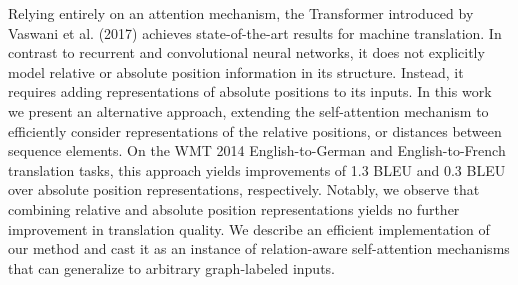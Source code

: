 Relying entirely on an attention mechanism, the Transformer introduced by Vaswani et al. (2017) achieves state-of-the-art results for machine translation. In contrast to recurrent and convolutional neural networks, it does not explicitly model relative or absolute position information in its structure. Instead, it requires adding representations of absolute positions to its inputs. In this work we present an alternative approach, extending the self-attention mechanism to efficiently consider representations of the relative positions, or distances between sequence elements. On the WMT 2014 English-to-German and English-to-French translation tasks, this approach yields improvements of 1.3 BLEU and 0.3 BLEU over absolute position representations, respectively. Notably, we observe that combining relative and absolute position representations yields no further improvement in translation quality. We describe an efficient implementation of our method and cast it as an instance of relation-aware self-attention mechanisms that can generalize to arbitrary graph-labeled inputs.
